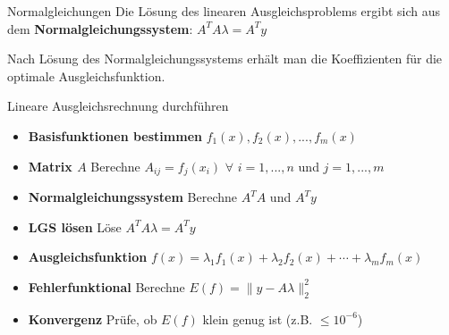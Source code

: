 \begin{theorem}{Normalgleichungen}
Die Lösung des linearen Ausgleichsproblems ergibt sich aus dem \textbf{Normalgleichungssystem}:
$A^T A \lambda = A^T y$

Nach Lösung des Normalgleichungssystems erhält man die Koeffizienten für die optimale Ausgleichsfunktion.
\end{theorem}

\begin{KR}{Lineare Ausgleichsrechnung durchführen}

    \begin{itemize}
        \item \textbf{Basisfunktionen bestimmen} $f_1(x), f_2(x), ..., f_m(x)$
        \item \textbf{Matrix $A$} Berechne $A_{ij} = f_j(x_i)$ $\forall$ $i = 1, ..., n$ und $j = 1, ..., m$
        \item \textbf{Normalgleichungssystem} Berechne $A^T A$ und $A^T y$
        \item \textbf{LGS lösen} Löse $A^T A \lambda = A^T y$ 
        \item \textbf{Ausgleichsfunktion} $f(x) = \lambda_1 f_1(x) + \lambda_2 f_2(x) + \cdots + \lambda_m f_m(x)$
        \item \textbf{Fehlerfunktional} Berechne $E(f) = \|y - A\lambda\|_2^2$
        \item \textbf{Konvergenz} Prüfe, ob $E(f)$ klein genug ist (z.B. $\leq 10^{-6}$)
    \end{itemize}
\end{KR}

